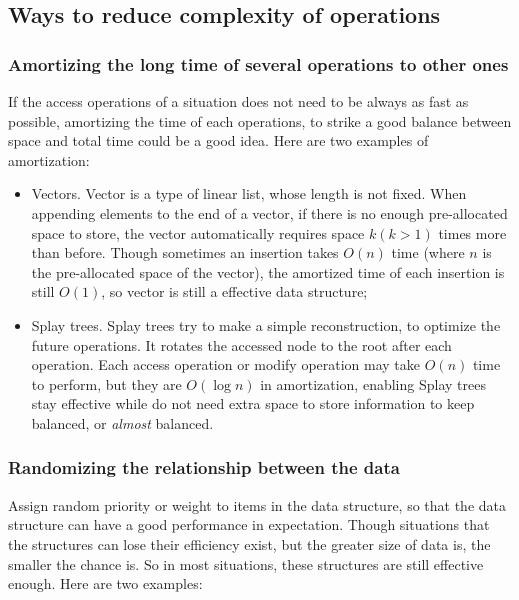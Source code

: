 \documentclass[scheme=plain,12pt]{ctexart}
\begin{document}
    \subsection{Ways to reduce complexity of operations}

    \subsubsection{Amortizing the long time of several operations to other ones}

    If the access operations of a situation does not need to be always as fast as possible,
    amortizing the time of each operations, to strike a good balance between space and total
    time could be a good idea. Here are two examples of amortization:

    \begin{itemize}
        \item Vectors. Vector is a type of linear list, whose length is not fixed. When appending
              elements to the end of a vector, if there is no enough pre-allocated space to
              store, the vector automatically requires space $k (k > 1)$ times more than before.
              Though sometimes an insertion takes $O(n)$ time (where $n$ is the pre-allocated
              space of the vector), the amortized time of each insertion is still $O(1)$, so
              vector is still a effective data structure;
        \item Splay trees. Splay trees try to make a simple reconstruction, to optimize the
              future operations. It rotates the accessed node to the root after each operation.
              Each access operation or modify operation may take $O(n)$ time to perform, but they
              are $O(\log n)$ in amortization, enabling Splay trees stay effective while do not
              need extra space to store information to keep balanced, or \emph{almost} balanced.
    \end{itemize}

    \subsubsection{Randomizing the relationship between the data}

    Assign random priority or weight to items in the data structure, so that the data structure
    can have a good performance in expectation. Though situations that the structures can lose
    their efficiency exist, but the greater size of data is, the smaller the chance is. So in
    most situations, these structures are still effective enough. Here are two examples:
\end{document}
